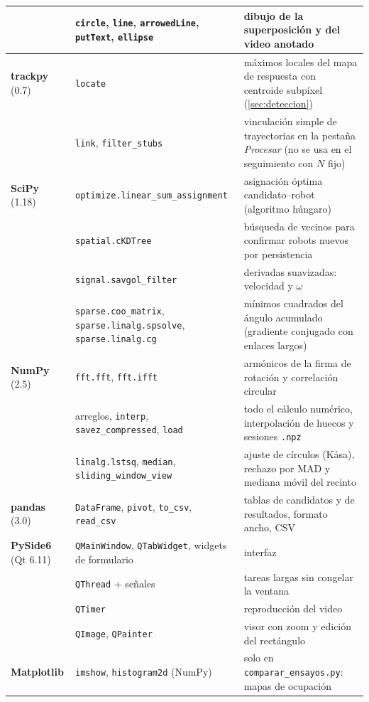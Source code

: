 \begin{table}[H]
\begin{tabular}{@{}p{2.4cm}p{5.6cm}p{6.6cm}@{}}
    & \texttt{circle}, \texttt{line}, \texttt{arrowedLine}, \texttt{putText}, \texttt{ellipse} & dibujo de la superposición y del video anotado \\
    \midrule
    \textbf{trackpy} \newline (0.7) &
      \texttt{locate} & máximos locales del mapa de respuesta con centroide subpíxel (\cref{sec:deteccion}) \\
    & \texttt{link}, \texttt{filter\_stubs} & vinculación simple de trayectorias en la pestaña \emph{Procesar} (no se usa en el seguimiento con $N$ fijo) \\
    \midrule
    \textbf{SciPy} \newline (1.18) &
      \texttt{optimize.linear\_sum\_assignment} & asignación óptima candidato--robot (algoritmo húngaro) \\
    & \texttt{spatial.cKDTree} & búsqueda de vecinos para confirmar robots nuevos por persistencia \\
    & \texttt{signal.savgol\_filter} & derivadas suavizadas: velocidad y $\omega$ \\
    & \texttt{sparse.coo\_matrix}, \texttt{sparse.linalg.spsolve}, \texttt{sparse.linalg.cg} & mínimos cuadrados del ángulo acumulado (gradiente conjugado con enlaces largos) \\
    \midrule
    \textbf{NumPy} \newline (2.5) &
      \texttt{fft.fft}, \texttt{fft.ifft} & armónicos de la firma de rotación y correlación circular \\
    & arreglos, \texttt{interp}, \texttt{savez\_compressed}, \texttt{load} & todo el cálculo numérico, interpolación de huecos y sesiones \texttt{.npz} \\
    & \texttt{linalg.lstsq}, \texttt{median}, \texttt{sliding\_window\_view} & ajuste de círculos (Kåsa), rechazo por MAD y mediana móvil del recinto \\
    \midrule
    \textbf{pandas} \newline (3.0) & \texttt{DataFrame}, \texttt{pivot}, \texttt{to\_csv}, \texttt{read\_csv} & tablas de candidatos y de resultados, formato ancho, CSV \\
    \midrule
    \textbf{PySide6} \newline (Qt 6.11) & \texttt{QMainWindow}, \texttt{QTabWidget}, widgets de formulario &
      interfaz \\
    & \texttt{QThread} + señales & tareas largas sin congelar la ventana \\
    & \texttt{QTimer} & reproducción del video \\
    & \texttt{QImage}, \texttt{QPainter} & visor con zoom y edición del rectángulo \\
    \midrule
    \textbf{Matplotlib} & \texttt{imshow}, \texttt{histogram2d} (NumPy) & solo en \texttt{comparar\_ensayos.py}: mapas de ocupación \\
    \bottomrule
  \end{tabular}
\end{table}

